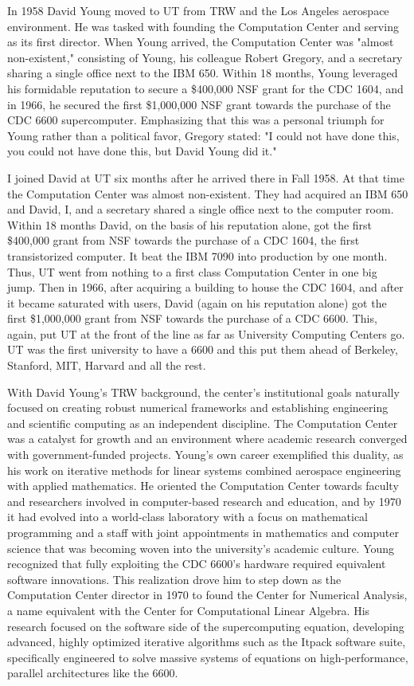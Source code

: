In 1958 David Young moved to UT from TRW and the Los Angeles aerospace environment. He was tasked with founding the Computation Center and serving as its first director. When Young arrived, the Computation Center was "almost non-existent," consisting of Young, his colleague Robert Gregory, and a secretary sharing a single office next to the IBM 650. Within 18 months, Young leveraged his formidable reputation to secure a \$400,000 NSF grant for the CDC 1604, and in 1966, he secured the first \$1,000,000 NSF grant towards the purchase of the CDC 6600 supercomputer. Emphasizing that this was a personal triumph for Young rather than a political favor, Gregory stated: "I could not have done this, you could not have done this, but David Young did it."

I joined David at UT six months after he arrived there in Fall 1958. At that time the Computation Center was almost non-existent. They had acquired an IBM 650 and David, I, and a secretary shared a single office next to the computer room. Within 18 months David, on the basis of his reputation alone, got the first \$400,000 grant from NSF towards the purchase of a CDC 1604, the first transistorized computer. It beat the IBM 7090 into production by one month. Thus, UT went from nothing to a first class Computation Center in one big jump. Then in 1966, after acquiring a building to house the CDC 1604, and after it became saturated with users, David (again on his reputation alone) got the first \$1,000,000 grant from NSF towards the purchase of a CDC 6600. This, again, put UT at the front of the line as far as University Computing Centers go. UT was the first university to have a 6600 and this put them ahead of Berkeley, Stanford, MIT, Harvard and all the rest.

With David Young's TRW background, the center’s institutional goals naturally focused on creating robust numerical frameworks and establishing engineering and scientific computing as an independent discipline. The Computation Center was a catalyst for growth and an environment where academic research converged with government-funded projects. Young’s own career exemplified this duality, as his work on iterative methods for linear systems combined aerospace engineering with applied mathematics. He oriented the Computation Center towards faculty and researchers involved in computer-based research and education, and by 1970 it had evolved into a world-class laboratory with a focus on mathematical programming and a staff with joint appointments in mathematics and computer science that was becoming woven into the university's academic culture. Young recognized that fully exploiting the CDC 6600's hardware required equivalent software innovations. This realization drove him to step down as the Computation Center director in 1970 to found the Center for Numerical Analysis, a name equivalent with the Center for Computational Linear Algebra. His research focused on the software side of the supercomputing equation, developing advanced, highly optimized iterative algorithms such as the Itpack software suite, specifically engineered to solve massive systems of equations on high-performance, parallel architectures like the 6600.

